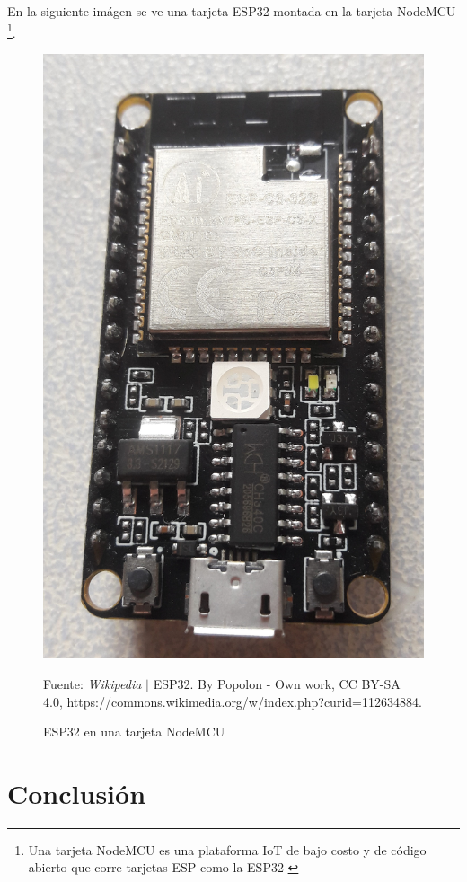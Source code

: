 \documentclass[conference]{IEEEtran}
\begin{document}
    \bigbreak

    En la siguiente imágen se ve una tarjeta ESP32 montada en la tarjeta NodeMCU \footnote{Una tarjeta NodeMCU es una plataforma IoT de bajo costo y de código abierto que corre tarjetas ESP como la ESP32 \cite{wikipedia-mcu-2022B}}.

    \begin{figure}[H]
        \centering
        \includegraphics[width=0.3\paperwidth]{images/esp32-board}
        \caption{ESP32 en una tarjeta NodeMCU} \footnotesize
        Fuente: \textit{Wikipedia} $\mid$ ESP32. By Popolon - Own work, CC BY-SA 4.0, https://commons.wikimedia.org/w/index.php?curid=112634884.
    \end{figure}


    \section{}




    \section{Conclusión}\label{sec:conclusion}




    \printbibliography
\end{document}

